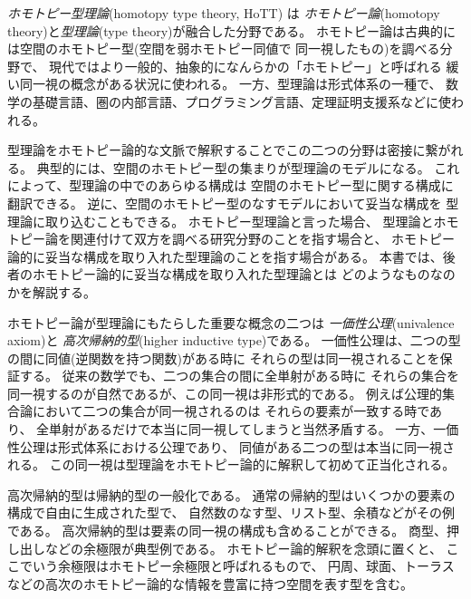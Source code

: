 \documentclass[index]{subfiles}
\begin{document}

\emph{ホモトピー型理論}(homotopy type theory, HoTT) は
\emph{ホモトピー論}(homotopy theory)と\emph{型理論}(type theory)が融合した分野である。
ホモトピー論は古典的には空間のホモトピー型(空間を弱ホモトピー同値で
同一視したもの)を調べる分野で、
現代ではより一般的、抽象的になんらかの「ホモトピー」と呼ばれる
緩い同一視の概念がある状況に使われる。
一方、型理論は形式体系の一種で、
数学の基礎言語、圏の内部言語、プログラミング言語、定理証明支援系などに使われる。

型理論をホモトピー論的な文脈で解釈することでこの二つの分野は密接に繋がれる。
典型的には、空間のホモトピー型の集まりが型理論のモデルになる。
これによって、型理論の中でのあらゆる構成は
空間のホモトピー型に関する構成に翻訳できる。
逆に、空間のホモトピー型のなすモデルにおいて妥当な構成を
型理論に取り込むこともできる。
ホモトピー型理論と言った場合、
型理論とホモトピー論を関連付けて双方を調べる研究分野のことを指す場合と、
ホモトピー論的に妥当な構成を取り入れた型理論のことを指す場合がある。
本書では、後者のホモトピー論的に妥当な構成を取り入れた型理論とは
どのようなものなのかを解説する。

ホモトピー論が型理論にもたらした重要な概念の二つは
\emph{一価性公理}(univalence axiom)と
\emph{高次帰納的型}(higher inductive type)である。
一価性公理は、二つの型の間に同値(逆関数を持つ関数)がある時に
それらの型は同一視されることを保証する。
従来の数学でも、二つの集合の間に全単射がある時に
それらの集合を同一視するのが自然であるが、この同一視は非形式的である。
例えば公理的集合論において二つの集合が同一視されるのは
それらの要素が一致する時であり、
全単射があるだけで本当に同一視してしまうと当然矛盾する。
一方、一価性公理は形式体系における公理であり、
同値がある二つの型は本当に同一視される。
この同一視は型理論をホモトピー論的に解釈して初めて正当化される。

高次帰納的型は帰納的型の一般化である。
通常の帰納的型はいくつかの要素の構成で自由に生成された型で、
自然数のなす型、リスト型、余積などがその例である。
高次帰納的型は要素の同一視の構成も含めることができる。
商型、押し出しなどの余極限が典型例である。
ホモトピー論的解釈を念頭に置くと、
ここでいう余極限はホモトピー余極限と呼ばれるもので、
円周、球面、トーラスなどの高次のホモトピー論的な情報を豊富に持つ空間を表す型を含む。

\begin{mySubsections}
  
\end{mySubsections}
\end{document}
